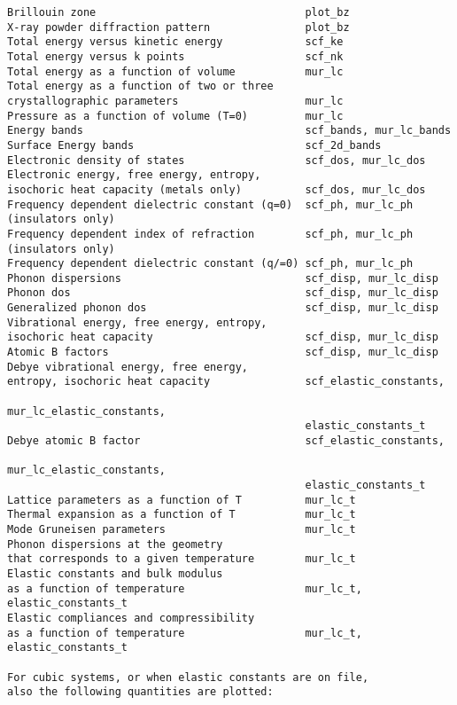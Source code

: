 \documentclass[12pt,a4paper,twoside]{report}
\begin{document}
\begin{footnotesize}
\begin{verbatim}
Brillouin zone                                 plot_bz
X-ray powder diffraction pattern               plot_bz
Total energy versus kinetic energy             scf_ke
Total energy versus k points                   scf_nk
Total energy as a function of volume           mur_lc
Total energy as a function of two or three
crystallographic parameters                    mur_lc
Pressure as a function of volume (T=0)         mur_lc
Energy bands                                   scf_bands, mur_lc_bands
Surface Energy bands                           scf_2d_bands
Electronic density of states                   scf_dos, mur_lc_dos
Electronic energy, free energy, entropy,      
isochoric heat capacity (metals only)          scf_dos, mur_lc_dos
Frequency dependent dielectric constant (q=0)  scf_ph, mur_lc_ph
(insulators only)
Frequency dependent index of refraction        scf_ph, mur_lc_ph
(insulators only)
Frequency dependent dielectric constant (q/=0) scf_ph, mur_lc_ph
Phonon dispersions                             scf_disp, mur_lc_disp
Phonon dos                                     scf_disp, mur_lc_disp
Generalized phonon dos                         scf_disp, mur_lc_disp
Vibrational energy, free energy, entropy,      
isochoric heat capacity                        scf_disp, mur_lc_disp
Atomic B factors                               scf_disp, mur_lc_disp
Debye vibrational energy, free energy, 
entropy, isochoric heat capacity               scf_elastic_constants, 
                                               mur_lc_elastic_constants,
                                               elastic_constants_t
Debye atomic B factor                          scf_elastic_constants,
                                               mur_lc_elastic_constants,
                                               elastic_constants_t
Lattice parameters as a function of T          mur_lc_t
Thermal expansion as a function of T           mur_lc_t 
Mode Gruneisen parameters                      mur_lc_t
Phonon dispersions at the geometry 
that corresponds to a given temperature        mur_lc_t
Elastic constants and bulk modulus
as a function of temperature                   mur_lc_t, elastic_constants_t
Elastic compliances and compressibility
as a function of temperature                   mur_lc_t, elastic_constants_t

For cubic systems, or when elastic constants are on file,
also the following quantities are plotted:


\end{verbatim}
\end{footnotesize}
\end{document}
